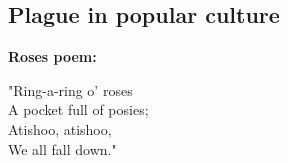 %
%

\subsection*{Plague in popular culture}

\textbf{Roses poem:}\\

\begin{center}
"Ring-a-ring o’ roses\\
A pocket full of posies;\\
Atishoo, atishoo,\\
We all fall down."
\end{center}

